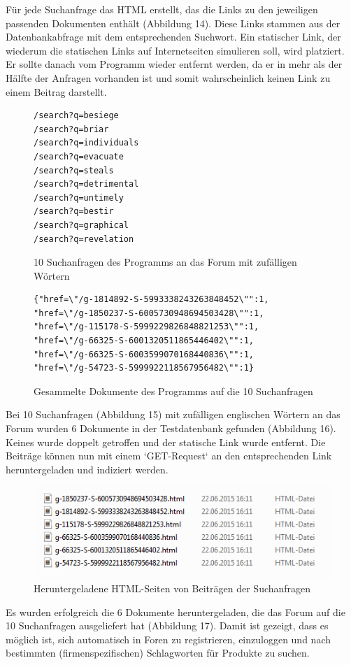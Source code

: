 Für jede Suchanfrage das HTML erstellt, das die Links zu den jeweiligen passenden Dokumenten enthält (Abbildung 14). Diese Links stammen aus der Datenbankabfrage mit dem entsprechenden Suchwort.
Ein statischer Link, der wiederum die statischen Links auf Internetseiten simulieren soll, wird platziert. Er sollte danach vom Programm wieder entfernt werden, da er in mehr als der Hälfte der Anfragen vorhanden ist und somit wahrscheinlich keinen Link zu einem Beitrag darstellt.

\begin{figure}[h!]
\begin{lstlisting}[language=HTML5]
/search?q=besiege
/search?q=briar
/search?q=individuals
/search?q=evacuate
/search?q=steals
/search?q=detrimental
/search?q=untimely
/search?q=bestir
/search?q=graphical
/search?q=revelation
\end{lstlisting}
\caption{10 Suchanfragen des Programms an das Forum mit zufälligen Wörtern}
\end{figure}

\begin{figure}[h!]
\begin{lstlisting}[language=HTML5]
{"href=\"/g-1814892-S-5993338243263848452\"":1,
"href=\"/g-1850237-S-6005730948694503428\"":1,
"href=\"/g-115178-S-5999229826848821253\"":1,
"href=\"/g-66325-S-6001320511865446402\"":1,
"href=\"/g-66325-S-6003599070168440836\"":1,
"href=\"/g-54723-S-5999922118567956482\"":1}
\end{lstlisting}
\caption{Gesammelte Dokumente des Programms auf die 10 Suchanfragen}
\end{figure}

Bei 10 Suchanfragen (Abbildung 15) mit zufälligen englischen Wörtern an das Forum wurden 6 Dokumente in der Testdatenbank gefunden (Abbildung 16). Keines wurde doppelt getroffen und der statische Link wurde entfernt. Die Beiträge können nun mit einem `GET-Request` an den entsprechenden Link heruntergeladen und indiziert werden.
\newpage

\begin{figure}[h!]
\includegraphics{./images/postdownload.png}
\caption{Heruntergeladene HTML-Seiten von Beiträgen der Suchanfragen}
\end{figure}


Es wurden erfolgreich die 6 Dokumente heruntergeladen, die das Forum auf die 10 Suchanfragen ausgeliefert hat (Abbildung 17).
Damit ist gezeigt, dass es möglich ist, sich automatisch in Foren zu registrieren, einzuloggen und nach bestimmten (firmenspezifischen) Schlagworten für Produkte zu suchen.
\newpage

